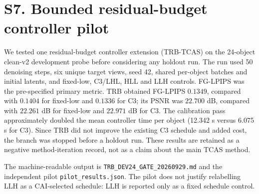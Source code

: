 \documentclass[10pt]{article}
\begin{document}
\section{S7. Bounded residual-budget controller pilot}

We tested one residual-budget controller extension (TRB-TCAS) on the
24-object clean-v2 development probe before considering any holdout run. The
run used 50 denoising steps, six unique target views, seed 42, shared
per-object batches and initial latents, and fixed-low, C3/LHL, HLL and LLH
controls. FG-LPIPS was the pre-specified primary metric. TRB obtained
FG-LPIPS $0.1349$, compared with $0.1404$ for fixed-low and $0.1336$ for C3;
its PSNR was $22.700$ dB, compared with $22.261$ dB for fixed-low and
$22.971$ dB for C3. The calibration pass approximately doubled the mean
controller time per object (12.342 s versus 6.075 s for C3). Since TRB did
not improve the existing C3 schedule and added cost, the branch was stopped
before a holdout run. These results are retained as a negative method-iteration
record, not as a claim about the main TCAS method.

The machine-readable output is
\texttt{TRB\_DEV24\_GATE\_20260929.md} and the independent pilot
\texttt{pilot\_results.json}. The pilot does not justify relabelling LLH as a
CAI-selected schedule: LLH is reported only as a fixed schedule control.
\end{document}

